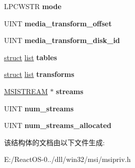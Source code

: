 \begin{DoxyCompactItemize}
L\+P\+C\+W\+S\+TR {\bfseries mode}
\item 
\mbox{\label{structtag_m_s_i_d_a_t_a_b_a_s_e_ac5460224d578fd58f2f220fbc789e60c}} 
U\+I\+NT {\bfseries media\+\_\+transform\+\_\+offset}
\item 
\mbox{\label{structtag_m_s_i_d_a_t_a_b_a_s_e_a0b085c61edc6e04e099b59901daa0324}} 
U\+I\+NT {\bfseries media\+\_\+transform\+\_\+disk\+\_\+id}
\item 
\mbox{\label{structtag_m_s_i_d_a_t_a_b_a_s_e_a77fd31051ecc30974c84d48dee3216d6}} 
\hyperlink{interfacestruct}{struct} \hyperlink{classlist}{list} {\bfseries tables}
\item 
\mbox{\label{structtag_m_s_i_d_a_t_a_b_a_s_e_a63d55fbae574330f4fa26784f819d023}} 
\hyperlink{interfacestruct}{struct} \hyperlink{classlist}{list} {\bfseries transforms}
\item 
\mbox{\label{structtag_m_s_i_d_a_t_a_b_a_s_e_a27adbd8242e25dff3571c4cf5f0b8013}} 
\hyperlink{structtag_m_s_i_s_t_r_e_a_m}{M\+S\+I\+S\+T\+R\+E\+AM} $\ast$ {\bfseries streams}
\item 
\mbox{\label{structtag_m_s_i_d_a_t_a_b_a_s_e_a51607bdd1fd888cc079692222abf7a00}} 
U\+I\+NT {\bfseries num\+\_\+streams}
\item 
\mbox{\label{structtag_m_s_i_d_a_t_a_b_a_s_e_a001e53b614bef49c142b5ee04d15ef93}} 
U\+I\+NT {\bfseries num\+\_\+streams\+\_\+allocated}
\end{DoxyCompactItemize}


该结构体的文档由以下文件生成\+:\begin{DoxyCompactItemize}
\item 
E\+:/\+React\+O\+S-\/0../dll/win32/msi/msipriv.\+h\end{DoxyCompactItemize}
